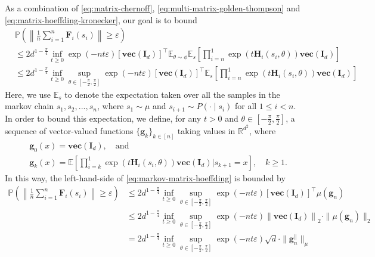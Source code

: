 As a combination of \eqref{eq:matrix-chernoff}, \eqref{eq:multi-matrix-golden-thompson} and \eqref{eq:matrix-hoeffding-kronecker}, our goal is to bound
\begin{align*}
&\mathbb{P}\left(\left\|\frac{1}{n}\sum_{i=1}^n \bm{F}_i(s_i)\right\| \geq \varepsilon \right)  \\ 
&\leq 2d^{1-\frac{\pi}{4}} \inf_{t \geq 0} \exp(-nt\varepsilon) [\mathbf{vec}(\bm{I}_d)]^\top \mathbb{E}_{\theta \sim \phi} \mathbb{E}_s\left[\prod_{i=n}^1 \exp(t\bm{H}_i(s_i,\theta))\mathbf{vec}(\bm{I}_d)\right] \\ 
&\leq 2d^{1-\frac{\pi}{4}} \inf_{t \geq 0}  \sup_{\theta \in [-\frac{\pi}{2},\frac{\pi}{2}]} \exp(-nt\varepsilon) [\mathbf{vec}(\bm{I}_d)]^\top \mathbb{E}_s\left[\prod_{i=n}^1 \exp(t\bm{H}_i(s_i,\theta))\mathbf{vec}(\bm{I}_d)\right]
\end{align*}
Here, we use $\mathbb{E}_s$ to denote the expectation taken over all the samples in the markov chain $s_1,s_2,...,s_n$, where $s_1 \sim \mu$ and $s_{i+1} \sim P(\cdot \mid s_i)$ for all $1 \leq i < n$. In order to bound this expectation, we define, for any $t>0$ and $\theta  \in [-\frac{\pi}{2},\frac{\pi}{2}]$, a sequence of vector-valued functions $\{\bm{g}_k\}_{k \in [n]}$ taking values in $\mathbb{R}^{d^2}$, where 
\begin{align*}
&\bm{g}_0 (x) = \textbf{vec}(\bm{I}_d), \quad \text{and} \\ 
&\bm{g}_k (x) = \mathbb{E}\left[\prod_{i=k}^1 \exp(t\bm{H}_i(s_i,\theta))\textbf{vec}(\bm{I}_d)\bigg| s_{k+1} = x\right], \quad k \geq 1.
\end{align*}
In this way, the left-hand-side of \eqref{eq:markov-matrix-hoeffding} is bounded by
\begin{align*}
\mathbb{P}\left(\left\|\frac{1}{n}\sum_{i=1}^n \bm{F}_i(s_i)\right\| \geq \varepsilon \right) &\leq   2d^{1-\frac{\pi}{4}} \inf_{t \geq 0}  \sup_{\theta \in [-\frac{\pi}{2},\frac{\pi}{2}]} \exp(-nt\varepsilon) [\mathbf{vec}(\bm{I}_d)]^\top \mu(\bm{g}_n) \\ 
&\leq 2d^{1-\frac{\pi}{4}} \inf_{t \geq 0}  \sup_{\theta \in [-\frac{\pi}{2},\frac{\pi}{2}]} \exp(-nt\varepsilon) \left\|\mathbf{vec}(\bm{I}_d)\right\|_2 \cdot \|\mu(\bm{g}_n)\|_2 \\ 
&= 2d^{1-\frac{\pi}{4}} \inf_{t \geq 0}  \sup_{\theta \in [-\frac{\pi}{2},\frac{\pi}{2}]} \exp(-nt\varepsilon) \sqrt{d} \cdot \|\bm{g}_n^{\parallel}\|_{\mu}
\end{align*}
